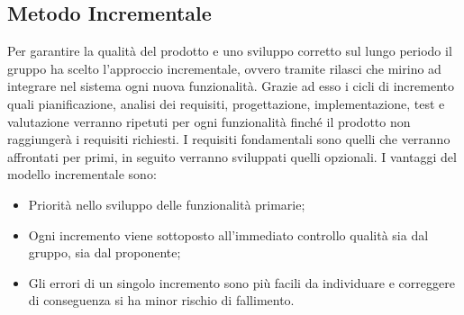 \documentclass[../piano_di_progetto.tex]{subfiles}
\begin{document}
\subsection{Metodo Incrementale}
\label{sub:incr}
Per garantire la qualità del prodotto e uno sviluppo corretto sul lungo periodo il gruppo ha scelto l’approccio incrementale, ovvero tramite rilasci che mirino ad integrare nel sistema ogni nuova funzionalità. Grazie ad esso i cicli di incremento quali pianificazione, analisi dei requisiti, progettazione, implementazione, test e valutazione verranno ripetuti per ogni funzionalità finché il prodotto non raggiungerà i requisiti richiesti. I requisiti fondamentali sono quelli che verranno affrontati per primi, in seguito verranno sviluppati quelli opzionali.
I vantaggi del modello incrementale sono:
\begin{itemize}
    \item Priorità nello sviluppo delle funzionalità primarie;
    \item Ogni incremento viene sottoposto all’immediato controllo qualità sia dal gruppo, sia dal proponente;
    \item Gli errori di un singolo incremento sono più facili da individuare e correggere di conseguenza si ha minor rischio di fallimento.
\end{itemize}
\end{document}

